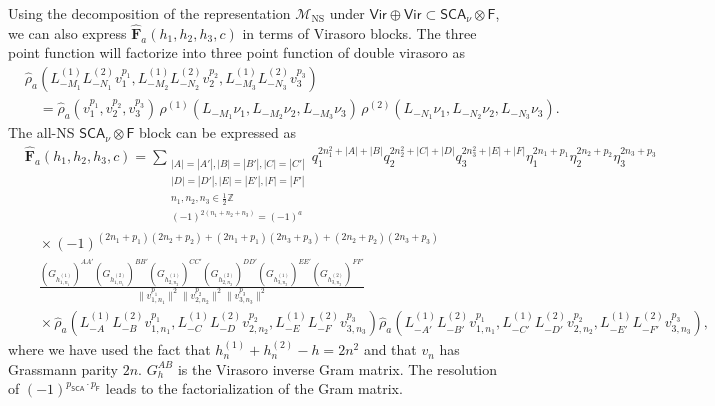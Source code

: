 \documentclass[12pt]{article}
\newcommand{\ie}{\begin{equation}\begin{aligned}}
\newcommand{\fe}{\end{aligned}\end{equation}}
\numberwithin{equation}{section}
\begin{document}
Using the decomposition of the representation $\mathcal{M}_{\text{NS}}$ under $\mathsf{Vir}\oplus \mathsf{Vir}\subset \mathsf{SCA}_\nu \otimes \mathsf{F}$, we can also express $\widehat{\mathbf{F}}_a(h_1, h_2, h_3, c)$ in terms of Virasoro blocks. The three point function will factorize into  three point function of double virasoro as
\ie
&\widehat\rho_a\!\left(
L_{-M_1}^{(1)}L_{-N_1}^{(2)}v_1^{p_1},
L_{-M_2}^{(1)}L_{-N_2}^{(2)}v_2^{p_2},
L_{-M_3}^{(1)}L_{-N_3}^{(2)}v_3^{p_3}
\right)
\\
&\quad =
\widehat\rho_a(v_1^{p_1},v_2^{p_2},v_3^{p_3})\,
\rho^{(1)}(L_{-M_1}\nu_1,L_{-M_2}\nu_2,L_{-M_3}\nu_3)\,
\rho^{(2)}(L_{-N_1}\nu_1,L_{-N_2}\nu_2,L_{-N_3}\nu_3).
\fe
The all-NS $\mathsf{SCA}_\nu \otimes \mathsf{F}$ block can be expressed as
\ie
&\widehat{\mathbf{F}}_a(h_1, h_2, h_3, c) = \sum_{\substack{|A|=|A'|, |B|=|B'|, |C|=|C'| \\ |D|=|D'|, |E|=|E'|, |F|=|F'| \\ n_1, n_2, n_3\in \frac{1}{2}\mathbb{Z} \\ (-1)^{2(n_1+n_2+n_3)}=(-1)^a}} q_1^{2n_1^2+|A|+|B|}q_2^{2n_2^2+|C|+|D|}q_3^{2n_3^2+|E|+|F|}\eta_1^{2n_1+p_1}\eta_2^{2n_2+p_2}\eta_3^{2n_3+p_3}\\
&\quad \times (-1)^{(2n_1+p_1)(2n_2+p_2)+(2n_1+p_1)(2n_3+p_3)+(2n_2+p_2)(2n_3+p_3)} \\
&\quad \frac{(G_{h_{1,n_1}^{(1)}})^{AA'}(G_{h_{1,n_1}^{(2)}})^{BB'}(G_{h_{2,n_2}^{(1)}})^{CC'}(G_{h_{2,n_2}^{(2)}})^{DD'}(G_{h_{3,n_3}^{(1)}})^{EE'}(G_{h_{3,n_3}^{(2)}})^{FF'}}{\|v^{p_1}_{1,n_1}\|^2\|v^{p_2}_{2,n_2}\|^2\|v^{p_3}_{3,n_3}\|^2}\\
&\quad \times \hat{\rho}_a(L_{-A}^{(1)}L_{-B}^{(2)}v^{p_1}_{1,n_1},L_{-C}^{(1)}L_{-D}^{(2)}v^{p_2}_{2,n_2},L_{-E}^{(1)}L_{-F}^{(2)}v^{p_3}_{3,n_3})\hat{\rho}_a(L_{-A'}^{(1)}L_{-B'}^{(2)}v^{p_1}_{1,n_1},L_{-C'}^{(1)}L_{-D'}^{(2)}v^{p_2}_{2,n_2},L_{-E'}^{(1)}L_{-F'}^{(2)}v^{p_3}_{3,n_3}),
\fe
where we have used the fact that $h_{n}^{(1)}+h_{n}^{(2)}-h = 2n^2$ and that $v_n$ has Grassmann parity $2n$. $G_h^{AB}$ is the Virasoro inverse Gram matrix. The resolution of $(-1)^{p_{\mathsf{SCA}}\cdot p_{\mathsf{F}}}$ leads to the factorialization of the Gram matrix.
\end{document}
